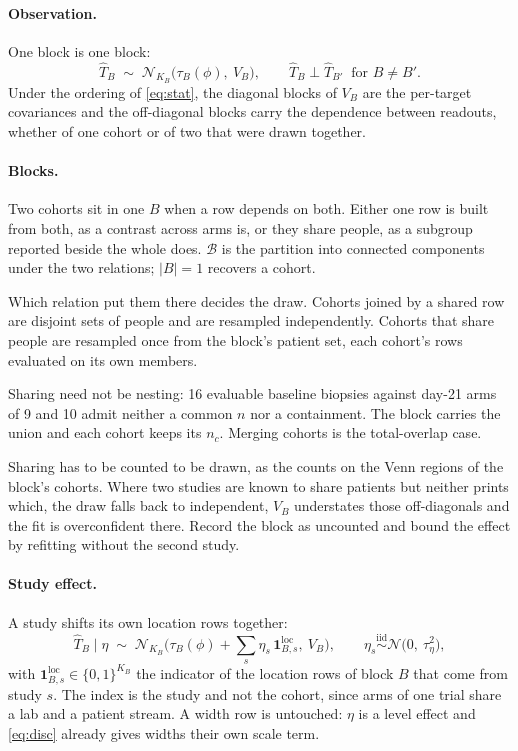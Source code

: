 \documentclass[11pt]{article}
\newcommand{\Ncal}{\mathcal{N}}
\newcommand{\Bset}{\mathcal{B}}
\begin{document}
\paragraph{Observation.} One block is one block:
\begin{equation}
\widehat T_{B} \;\sim\; \Ncal_{K_{B}}\big(\tau_{B}(\phi),\ V_{B}\big),
\qquad
\widehat T_{B} \perp \widehat T_{B'} \ \text{ for } B\neq B' .
\label{eq:obs}
\end{equation}
Under the ordering of \eqref{eq:stat}, the diagonal blocks of $V_B$ are the
per-target covariances and the off-diagonal blocks carry the dependence between
readouts, whether of one cohort or of two that were drawn together.

\paragraph{Blocks.} Two cohorts sit in one $B$ when a row depends on both. Either
one row is built from both, as a contrast across arms is, or they share people,
as a subgroup reported beside the whole does. $\Bset$ is the partition into
connected components under the two relations; $|B|=1$ recovers a cohort.

Which relation put them there decides the draw. Cohorts joined by a shared row
are disjoint sets of people and are resampled independently. Cohorts that share
people are resampled once from the block's patient set, each cohort's rows
evaluated on its own members.

Sharing need not be nesting: 16 evaluable baseline biopsies against day-21 arms
of 9 and 10 admit neither a common $n$ nor a containment. The block carries the
union and each cohort keeps its $n_c$. Merging cohorts is the total-overlap case.

Sharing has to be counted to be drawn, as the counts on the Venn regions of the
block's cohorts. Where two studies are known to share patients but neither
prints which, the draw falls back to independent, $V_B$ understates those
off-diagonals and the fit is overconfident there. Record the block as uncounted
and bound the effect by refitting without the second study.

\paragraph{Study effect.} A study shifts its own location rows together:
\begin{equation}
\widehat T_B \mid \eta \;\sim\; \Ncal_{K_B}\Big(
  \tau_B(\phi) + \textstyle\sum_{s} \eta_s\,\mathbf{1}^{\mathrm{loc}}_{B,s},
  \ V_B\Big),
\qquad
\eta_s \stackrel{\text{iid}}{\sim} \Ncal\big(0,\ \tau_\eta^2\big),
\label{eq:studyeff}
\end{equation}
with $\mathbf{1}^{\mathrm{loc}}_{B,s}\in\{0,1\}^{K_B}$ the indicator of the
location rows of block $B$ that come from study $s$. The index is the study and
not the cohort, since arms of one trial share a lab and a patient stream. A width
row is untouched: $\eta$ is a level effect and \eqref{eq:disc} already gives
widths their own scale term.
\end{document}
